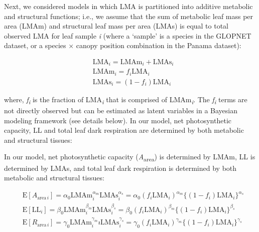 \documentclass[
  12pt,
]{article}
\begin{document}
Next, we considered models in which LMA is partitioned into additive metabolic and structural functions; i.e., we assume that the sum of metabolic leaf mass per area (LMAm) and structural leaf mass per area (LMAs) is equal to total observed LMA for leaf sample \emph{i} (where a `sample' is a species in the GLOPNET dataset, or a species × canopy position combination in the Panama dataset):

\begin{align}
  &\mathrm{LMA}_{i} =\mathrm{LMAm}_{i} + \mathrm{LMAs}_{i} \label{eq:LMA}\\
  &\mathrm{LMAm}_{i} = f_{i} \mathrm{LMA}_{i} \label{eq:LMAm}\\
  &\mathrm{LMAs}_{i} = (1 - f_{i})  \mathrm{LMA}_{i}\label{eq:LMAs}
\end{align}

where, \emph{f\textsubscript{i}} is the fraction of LMA\textsubscript{\emph{i}} that is comprised of LMAm\textsubscript{\emph{i}}.
The \emph{f\textsubscript{i}} terms are not directly observed but can be estimated as latent variables in a Bayesian modeling framework (see details below).
In our model, net photosynthetic capacity, LL and total leaf dark respiration are determined by both metabolic and structural tissues:

In our model, net photosynthetic capacity (\emph{A}\textsubscript{area}) is determined by LMAm, LL is determined by LMAs, and total leaf dark respiration is determined by both metabolic and structural tissues:

\begin{align}
& \mathrm{E}[A_{\mathrm{area} \, i}]
= \alpha_0\mathrm{LMAm}_{i}^{\alpha_m}\mathrm{LMAs}_i^{\alpha_s}  =  \alpha_0 (f_i \mathrm{LMA}_{i})^{\alpha_m} \bigl\{(1-f_i) \mathrm{LMA}_{i}\bigr\}^{\alpha_s} \label{eq:E-A} \\
& \mathrm{E}[\mathrm{LL}_i] = \beta_0\mathrm{LMAm}_{i}^{\beta_m} \mathrm{LMAs}_{i}^{\beta_s}   = \beta_0 (f_i \mathrm{LMA}_{i})^{\beta_m} \bigl\{(1-f_i) \mathrm{LMA}_{i}\bigr\}^{\beta_s} \label{eq:E-LL} \\
& \mathrm{E}[R_{\mathrm{area} \, i}]
= \gamma_0\mathrm{LMAm}_{i}^{\gamma_m}ı \mathrm{LMAs}_{i}^{\gamma_s}
= \gamma_0 (f_i \mathrm{LMA}_{i})^{\gamma_m} \bigl\{(1-f_i)\mathrm{LMA}_{i}\bigr\}^{\gamma_s} \label{eq:E-R}
\end{align}
\end{document}

